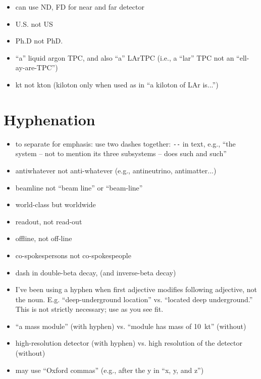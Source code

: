 \begin{itemize}
\item can use ND, FD for near and far detector
\item U.S. not US
\item Ph.D not PhD.
\item ``a'' liquid argon TPC, and also ``a'' LArTPC (i.e., a ``lar'' TPC not an ``ell-ay-are-TPC'') 
\item \si{kt} not \si{kton} (kiloton only when used as in ``a kiloton of LAr is...'') 

\end{itemize}

\section{Hyphenation}
\label{sec:english-hyphen}

\begin{itemize}
\item to separate for emphasis: use two dashes together: \verb|--| in text, e.g.,  ``the system -- not to mention its three subsystems -- does such and such'' 
\item antiwhatever not anti-whatever (e.g., antineutrino, antimatter...)
\item beamline not ``beam line'' or ``beam-line'' 
\item world-class but worldwide   
\item readout, not read-out
\item offline, not off-line
\item co-spokespersons not co-spokespeople
\item dash in double-beta decay, (and inverse-beta decay)
\item I've been using a hyphen when first adjective modifies following adjective, not the noun. E.g. ``deep-underground location'' vs. ``located deep underground.''  This is not strictly necessary; use as you see fit.
\item ``a  mass module'' (with hyphen) vs. ``module has mass of \SI{10}{kt}'' (without)
\item high-resolution detector (with hyphen) vs. high resolution of the detector (without)
\item may use ``Oxford commas'' (e.g., after the y in ``x, y, and z'')
\end{itemize}

